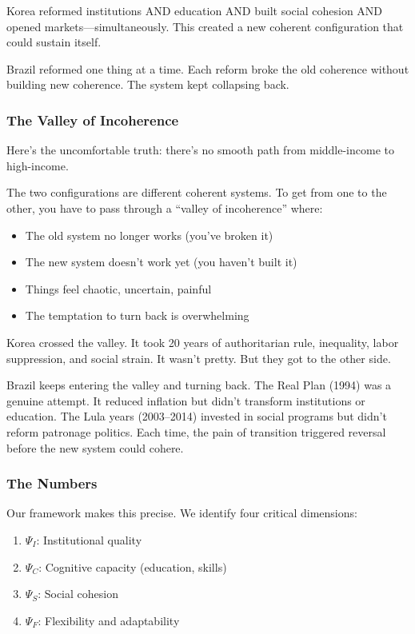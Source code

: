 Korea reformed institutions AND education AND built social cohesion AND 
opened markets---simultaneously. This created a new coherent configuration 
that could sustain itself.

Brazil reformed one thing at a time. Each reform broke the old coherence 
without building new coherence. The system kept collapsing back.

\subsubsection{The Valley of Incoherence}

Here's the uncomfortable truth: there's no smooth path from middle-income 
to high-income.

The two configurations are different coherent systems. To get from one 
to the other, you have to pass through a ``valley of incoherence'' where:

\begin{itemize}
    \item The old system no longer works (you've broken it)
    \item The new system doesn't work yet (you haven't built it)
    \item Things feel chaotic, uncertain, painful
    \item The temptation to turn back is overwhelming
\end{itemize}

Korea crossed the valley. It took 20 years of authoritarian rule, inequality, 
labor suppression, and social strain. It wasn't pretty. But they got to 
the other side.

Brazil keeps entering the valley and turning back. The Real Plan (1994) 
was a genuine attempt. It reduced inflation but didn't transform institutions 
or education. The Lula years (2003--2014) invested in social programs but 
didn't reform patronage politics. Each time, the pain of transition 
triggered reversal before the new system could cohere.

\subsubsection{The Numbers}

Our framework makes this precise. We identify four critical dimensions:

\begin{enumerate}
    \item $\Psi_I$: Institutional quality
    \item $\Psi_C$: Cognitive capacity (education, skills)
    \item $\Psi_S$: Social cohesion
    \item $\Psi_F$: Flexibility and adaptability
\end{enumerate}

